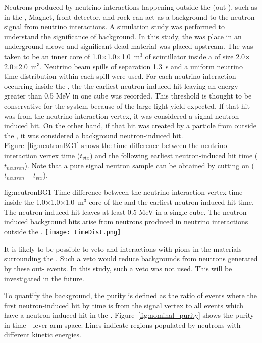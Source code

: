  Neutrons produced by neutrino interactions happening outside the   (out-), such as in the , Magnet, front detector, and rock can act as a background to the neutron signal from neutrino interactions. 
A simulation study was performed to understand the significance of background. In this study, the  was place in an underground alcove and significant dead material was placed upstream.  The  was taken to be an inner core of 1.0$\times$1.0$\times$1.0~m$^{3}$ of scintillator inside a  of size 2.0$\times$2.0$\times$2.0~m$^{3}$.  Neutrino beam spills of separation 1.3~s and a uniform neutrino time distribution within each spill were used.
For each neutrino interaction occurring inside the , the 
 the earliest neutron-induced hit leaving an energy greater than 0.5 MeV in one cube was recorded. This threshold is thought to be conservative for the  system because of the large light yield expected.  If that hit was from the neutrino interaction vertex, it was considered a signal neutron-induced hit. On the other hand, if that hit was created by a particle from outside the , it was considered a background neutron-induced hit.
Figure~\ref{fig:neutronBG1} shows the time difference between the neutrino interaction vertex time ($t_{vtx}$) and the following earliest neutron-induced hit time ($t_{neutron}$). 
Note that a pure signal neutron sample can be obtained by cutting on ($t_{neutron} - t_{vtx}$). 

\begin{dunefigure}{fig:neutronBG1}
{Time difference between the neutrino interaction vertex time inside the 1.0$\times$1.0$\times$1.0~m$^{3}$  core of the  and the earliest neutron-induced hit time. The neutron-induced hit leaves at least 0.5 MeV in a single cube. The neutron-induced background hits arise from neutrons produced in neutrino interactions outside the .}
  \texttt{[image: timeDist.png]}
\end{dunefigure}

It is likely to be possible to veto   and  interactions with pions in the materials surrounding the .  Such a veto would reduce backgrounds from neutrons generated by these out- events.  In this study, such a veto was not used. This will be investigated in the future.

To quantify the background, the purity is defined as the ratio of events where the first neutron-induced hit by time is from the signal vertex to all events which have a neutron-induced hit in the . 
Figure~\ref{fig:nominal_purity} shows the purity in time - lever arm space. Lines indicate regions populated by neutrons with different kinetic energies.

